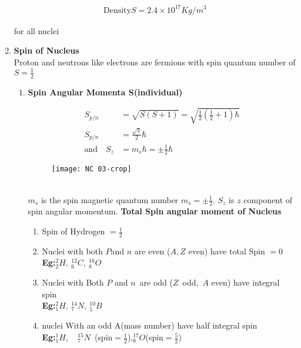 \begin{enumerate}
\begin{center}
{{			\begin{align*}
			\text{Density}S=2.4\times10^{17}Kg/m^3
			\end{align*}} }
\end{center}
for all nuclei
\item \textbf{Spin of Nucleus}\\
Proton and neutrons like electrons are fermions with spin quantum number of $S=\frac{1}{2}$
\begin{enumerate}
	\item \textbf{Spin Angular Momenta S(individual)}$\left. \right. $\\
\begin{minipage}{0.45\textwidth}
	\begin{align*}
	S_{p/n}&=\sqrt{S(S+1)}=\sqrt{\frac{1}{2}\left(\frac{1}{2} +1\right) \hbar}\\
	S_{p/n}&=\frac{\sqrt{3}}{2}\hbar\\
	\text{and}\quad
	S_z&=m_s\hbar=\pm\frac{1}{2}\hbar
	\end{align*}
\end{minipage}
\begin{minipage}{0.30\textwidth}
	\begin{figure}[H]
		\centering
		\texttt{[image: NC 03-crop]}
		\caption{}
		\label{Decreasing Function}
	\end{figure}
\end{minipage}\\
$m_s$ is the spin magnetic quantum number $m_s=\pm\frac{1}{2}$. $S_z$ is $z $ component of spin angular momentum.
 \textbf{Total Spin angular moment of Nucleus}\\
 \begin{enumerate}
 	\item Spin of Hydrogen $=\frac{1}{2}$\\
 	\item Nuclei with both $P$and $n$ are even ($A,Z$ even) have total 
 	Spin $=0$\\
 	\textbf{Eg:}\quad $^2_2 H,\  ^{12}_6 C,\ ^{16}_8 O$\\
 	\item Nuclei with Both $P$ and $n$\ are odd ($Z$\ odd,\ $A$ even) have 
 	integral spin\\
 	\textbf{Eg:}\quad $^2_1 H,\  ^{14}_7 N,\ ^{10}_5 B$\\
 	\item nuclei With an odd A(mass number) have half integral spin\\
 	\textbf{Eg:}\quad $^1_1 H,\quad ^{15}_7 N$\ (spin$=\frac{1}{2}$),\quad$^{17}_8 O$(spin$=\frac{5}{2}$)\\

\end{enumerate}
\end{enumerate}
\end{enumerate}
